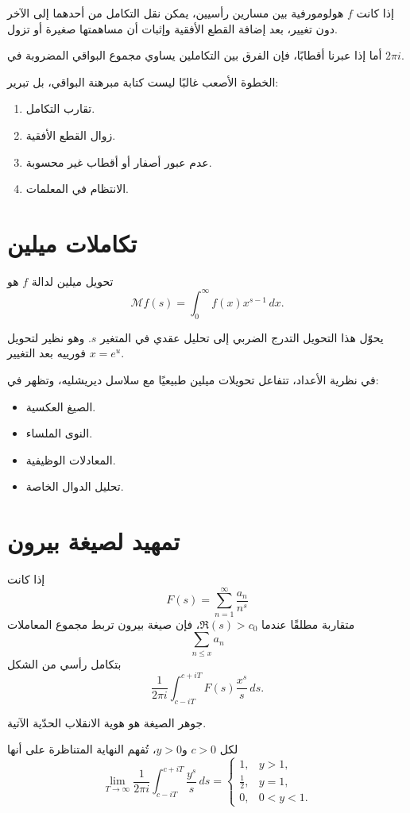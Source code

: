 إذا كانت \(f\) هولومورفية بين مسارين رأسيين، يمكن نقل التكامل من أحدهما إلى الآخر دون تغيير، بعد إضافة القطع الأفقية وإثبات أن مساهمتها صغيرة أو تزول.

أما إذا عبرنا أقطابًا، فإن الفرق بين التكاملين يساوي مجموع البواقي المضروبة في \(2\pi i\).

\begin{remark}
الخطوة الأصعب غالبًا ليست كتابة مبرهنة البواقي، بل تبرير:
\begin{enumerate}
  \item تقارب التكامل.
  \item زوال القطع الأفقية.
  \item عدم عبور أصفار أو أقطاب غير محسوبة.
  \item الانتظام في المعلمات.
\end{enumerate}
\end{remark}

\section{تكاملات ميلين}

تحويل ميلين لدالة \(f\) هو
\[
\mathcal{M}f(s)
=
\int_0^\infty f(x)x^{s-1}\,dx.
\]

يحوّل هذا التحويل التدرج الضربي إلى تحليل عقدي في المتغير \(s\). وهو نظير لتحويل فورييه بعد التغيير \(x=e^u\).

في نظرية الأعداد، تتفاعل تحويلات ميلين طبيعيًا مع سلاسل ديريشليه، وتظهر في:

\begin{itemize}
  \item الصيغ العكسية.
  \item النوى الملساء.
  \item المعادلات الوظيفية.
  \item تحليل الدوال الخاصة.
\end{itemize}

\section{تمهيد لصيغة بيرون}

إذا كانت
\[
F(s)=\sum_{n=1}^{\infty}\frac{a_n}{n^s}
\]
متقاربة مطلقًا عندما \(\Re(s)>c_0\)، فإن صيغة بيرون تربط مجموع المعاملات
\[
\sum_{n\leq x}a_n
\]
بتكامل رأسي من الشكل
\[
\frac{1}{2\pi i}
\int_{c-iT}^{c+iT}
F(s)\frac{x^s}{s}\,ds.
\]

جوهر الصيغة هو هوية الانقلاب الحدّية الآتية.

\begin{theorem}
\label{thm:perron-kernel}
لكل \(c>0\) و\(y>0\)، تُفهم النهاية المتناظرة على أنها
\[
\lim_{T\to\infty}
\frac{1}{2\pi i}
\int_{c-iT}^{c+iT}
\frac{y^s}{s}\,ds
=
\begin{cases}
1,& y>1,\\
\frac12,& y=1,\\
0,& 0<y<1.
\end{cases}
\]
\end{theorem}

